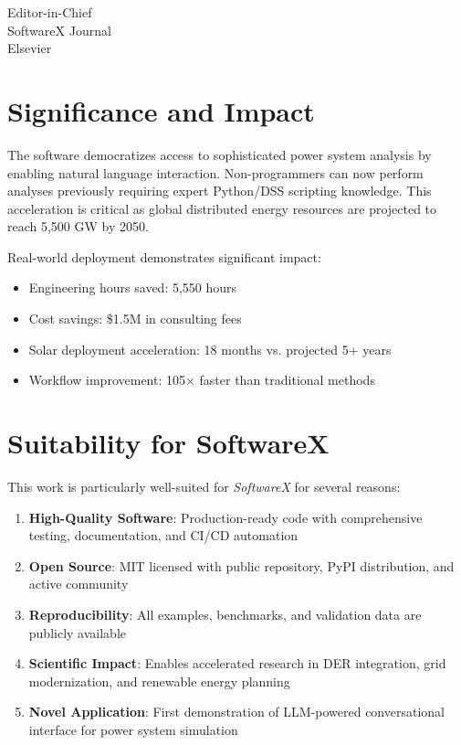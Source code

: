 \documentclass[11pt]{letter}
\begin{document}
\begin{letter}{
Editor-in-Chief\\
SoftwareX Journal\\
Elsevier
}
\section*{Significance and Impact}

The software democratizes access to sophisticated power system analysis by enabling natural language interaction. Non-programmers can now perform analyses previously requiring expert Python/DSS scripting knowledge. This acceleration is critical as global distributed energy resources are projected to reach 5,500 GW by 2050.

Real-world deployment demonstrates significant impact:
\begin{itemize}
    \item Engineering hours saved: 5,550 hours
    \item Cost savings: \$1.5M in consulting fees
    \item Solar deployment acceleration: 18 months vs. projected 5+ years
    \item Workflow improvement: 105× faster than traditional methods
\end{itemize}

\section*{Suitability for SoftwareX}

This work is particularly well-suited for \textit{SoftwareX} for several reasons:

\begin{enumerate}
    \item \textbf{High-Quality Software}: Production-ready code with comprehensive testing, documentation, and CI/CD automation

    \item \textbf{Open Source}: MIT licensed with public repository, PyPI distribution, and active community

    \item \textbf{Reproducibility}: All examples, benchmarks, and validation data are publicly available

    \item \textbf{Scientific Impact}: Enables accelerated research in DER integration, grid modernization, and renewable energy planning

    \item \textbf{Novel Application}: First demonstration of LLM-powered conversational interface for power system simulation
\end{enumerate}


\end{letter}
\end{document}

